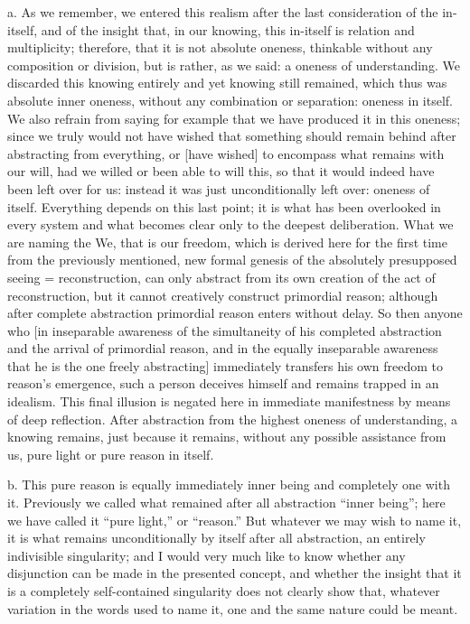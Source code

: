 a. As we remember, we entered this realism
after the last consideration of the in-itself,
and of the insight that, in our knowing,
this in-itself is relation and multiplicity;
therefore, that it is not absolute oneness,
thinkable without any composition or division,
but is rather, as we said:
a oneness of understanding.
We discarded this knowing entirely
and yet knowing still remained,
which thus was absolute inner oneness,
without any combination or separation:
oneness in itself.
We also refrain from saying for
example that we have produced it in this oneness;
since we truly would not have wished that
something should remain behind
after abstracting from everything,
or [have wished] to encompass what remains with our will,
had we willed or been able to will this,
so that it would indeed have been left over for us:
instead it was just unconditionally left over:
oneness of itself.
Everything depends on this last point;
it is what has been overlooked in every system
and what becomes clear only to the deepest deliberation.
What we are naming the We, that is our freedom,
which is derived here for the first time
from the previously mentioned,
new formal genesis of the absolutely
presupposed seeing = reconstruction,
can only abstract from its own
creation of the act of reconstruction,
but it cannot creatively construct primordial reason;
although after complete abstraction
primordial reason enters without delay.
So then anyone who [in inseparable awareness of
the simultaneity of his completed abstraction
and the arrival of primordial reason,
and in the equally inseparable awareness
that he is the one freely abstracting]
immediately transfers his own
freedom to reason's emergence,
such a person deceives himself
and remains trapped in an idealism.
This final illusion is negated here
in immediate manifestness by means of deep reflection.
After abstraction from the highest oneness of understanding,
a knowing remains, just because it remains,
without any possible assistance from us,
pure light or pure reason in itself.

b. This pure reason is equally immediately
inner being and completely one with it.
Previously we called what remained
after all abstraction “inner being”;
here we have called it “pure light,” or “reason.”
But whatever we may wish to name it,
it is what remains unconditionally
by itself after all abstraction,
an entirely indivisible singularity;
and I would very much like to know
whether any disjunction can be made
in the presented concept,
and whether the insight that it is
a completely self-contained singularity
does not clearly show that,
whatever variation in the words used to name it,
one and the same nature could be meant.

